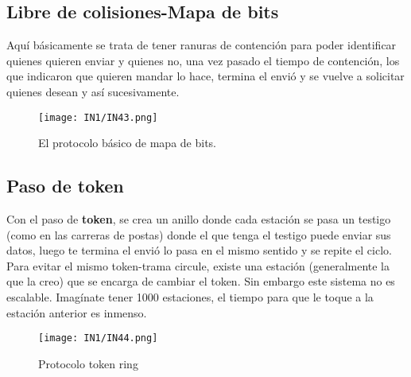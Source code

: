 \documentclass[
	12pt, %
	fleqn, %
	a4paper, %
	oneside, %
]{LegrandOrangeBook}
\begin{document}
\subsection{Libre de colisiones-Mapa de bits}
Aquí básicamente se trata de tener ranuras de contención para poder identificar quienes quieren enviar y quienes no, una vez pasado el tiempo de contención, los que indicaron que quieren mandar lo hace, termina el envió y se vuelve a solicitar quienes desean y así sucesivamente.
\begin{figure}[H]
\centering
\texttt{[image: IN1/IN43.png]}
\caption{El protocolo básico de mapa de bits.}
\label{fig: mapa de bits}
\end{figure}
\subsection{Paso de token}
Con el paso de \textbf{token}, se crea un anillo donde cada estación se pasa un testigo (como en las carreras de postas) donde el que tenga el testigo puede enviar sus datos, luego te termina el envió lo pasa en el mismo sentido y se repite el ciclo. Para evitar el mismo token-trama circule, existe una estación (generalmente la que la creo) que se encarga de cambiar el token. Sin embargo este sistema no es escalable. Imagínate tener 1000 estaciones, el tiempo para que le toque a la estación anterior es inmenso.
\begin{figure}[H]
\centering
\texttt{[image: IN1/IN44.png]}
\caption{Protocolo token ring}
\label{fig:token ring}
\end{figure}
\end{document}

